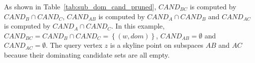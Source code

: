 As shown in Table~\ref{tab:sub_dom_cand_pruned}, $\mathit{CAND}_{BC}$ is computed by $\mathit{CAND}_{B} \cap \mathit{CAND}_{C}$, $\mathit{CAND}_{AB}$ is computed by $\mathit{CAND}_{A} \cap \mathit{CAND}_{B}$ and $\mathit{CAND}_{AC}$ is computed by $\mathit{CAND}_{A} \cap \mathit{CAND}_{C}$. In this example, $\mathit{CAND}_{BC} = \mathit{CAND}_B \cap \mathit{CAND}_C = \left\{(w, dom)\right\}$, $\mathit{CAND}_{AB} = \emptyset$ and $\mathit{CAND}_{AC} = \emptyset$.
The query vertex $z$ is a skyline point on subspaces $AB$ and $AC$ because their dominating candidate sets are all empty.
